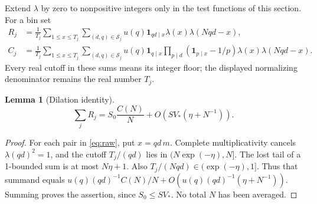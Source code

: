 \documentclass[11pt]{article}
\newtheorem{lemma}[theorem]{Lemma}
\theoremstyle{definition}
\newcommand{\ind}{\mathbf 1}
\begin{document}
Extend $\lambda$ by zero to nonpositive integers only in the test functions
of this section. For a bin set
\begin{align}
 R_j&=\frac1{T_j}\sum_{1\le x\le T_j}
       \sum_{(d,q)\in\mathcal S_j}u(q)\ind_{qd\mid x}
                                  \lambda(x)\lambda(Nqd-x),\label{eq:raw}\\
 C_j&=\frac1{T_j}\sum_{1\le x\le T_j}
       \sum_{(d,q)\in\mathcal S_j}u(q)\ind_{q\mid x}
       \prod_{p\mid d}(\ind_{p\mid x}-1/p)
                                  \lambda(x)\lambda(Nqd-x).
                                                    \label{eq:centered}
\end{align}
Every real cutoff in these sums means its integer floor; the displayed
normalizing denominator remains the real number $T_j$.

\begin{lemma}[Dilation identity]\label{lem:dilation}
\begin{equation}\label{eq:dilation}
 \sum_jR_j=S_0\frac{C(N)}N+O(SV_*(\eta+N^{-1})).
\end{equation}
\end{lemma}
\begin{proof}
For each pair in \eqref{eq:raw}, put $x=qd\,m$.
Complete multiplicativity cancels $\lambda(qd)^2=1$, and the cutoff
$T_j/(qd)$ lies in $(N\exp(-\eta),N]$.
The lost tail of a 1-bounded sum is at most $N\eta+1$.
Also $T_j/(Nqd)\in(\exp(-\eta),1]$.
Thus that summand equals
$u(q)(qd)^{-1}C(N)/N+O(u(q)(qd)^{-1}(\eta+N^{-1}))$.
Summing proves the assertion, since $S_0\le SV_*$.
No total $N$ has been averaged.
\end{proof}
\end{document}

